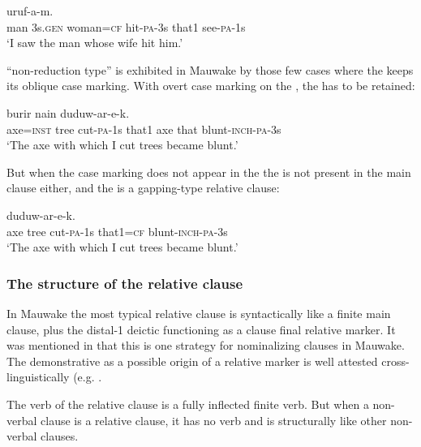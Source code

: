 \ea%
\label{ex:8:x1549}
\gll [Mua  ona  emeria=ke  aruf-a-k  nain]  uruf-a-m. \\
man  3s.\textsc{gen} woman=\textsc{cf} hit-\textsc{pa}-3s that1 see-\textsc{pa}-1s\\
\glt`I saw the man whose wife hit him.'
\z


 ``non-reduction type'' is exhibited in Mauwake by those few cases where the  keeps its oblique case marking. With overt case marking on the , the  has to be retained:

\ea%
\label{ex:8:x1544}
\gll [\textbf{Burir=iw}  nomokowa  war-em  nain,]  burir  nain  duduw-ar-e-k.\\
axe=\textsc{inst} tree cut-\textsc{pa}-1s that1 axe that blunt-\textsc{inch}-\textsc{pa}-3s\\
\glt`The axe with which I cut trees became blunt.'
\z
{}


But when the case marking does not appear in the  the  is not present in the main clause either, and the  is a gapping-type relative clause:

\ea%
\label{ex:8:x1541}
\gll [\textbf{Burir}  nomokowa  war-e-m  nain=ke]  duduw-ar-e-k. \\
axe  tree  cut-\textsc{pa}-1s that1=\textsc{cf} blunt-\textsc{inch}-\textsc{pa}-3s\\
\glt`The axe with which I cut trees became blunt.'
\z


\subsubsection{The structure of the relative clause} \label{sec:8.3.1.2}

In Mauwake the most typical relative clause is syntactically like a finite main clause, plus the distal-1 deictic  functioning as a clause final relative marker. It was mentioned in  that this is one strategy for nominalizing clauses in Mauwake. The demonstrative as a possible origin of a relative marker is well attested cross-linguistically (e.g. \citealt[342]{Dixon2010b}. 

The verb of the relative clause is a fully inflected finite verb. But when a non-verbal clause is a relative clause, it has no verb and is structurally like other non-verbal clauses. 


